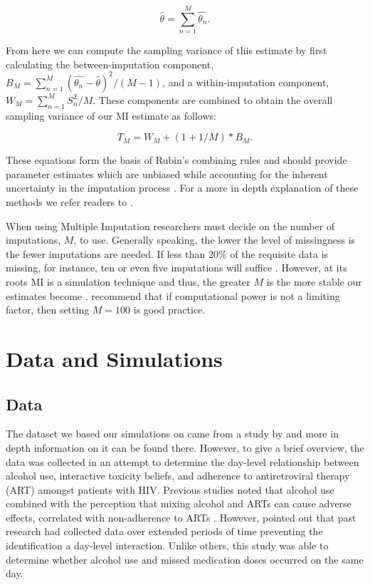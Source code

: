 \documentclass{svjour3}                     %
\begin{document}
\begin{equation}
\widehat{\theta} = \sum_{n=1}^{M} \widehat{\theta_n}.
\end{equation}

From here we can compute the sampling variance of this estimate by first calculating the between-imputation component, $B_M = \sum_{n=1}^{M} (\widehat{\theta_n} - \widehat{\theta})^2 / (M-1)$, and a within-imputation component, $W_M = \sum_{n=1}^{M} S_n^2 / M$. These components are combined to obtain the overall sampling variance of our MI estimate as follows:

\begin{equation}
T_M = W_M + (1+1/M)*B_M.
\end{equation}

These equations form the basis of Rubin's combining rules and should provide parameter estimates which are unbiased while accounting for the inherent uncertainty in the imputation process \citep{raghunathan2015missing}. For a more in depth explanation of these methods we refer readers to \citet{little2014statistical}. \par

When using Multiple Imputation researchers must decide on the number of imputations, $M$, to use. Generally speaking, the lower the level of missingness is the fewer imputations are needed. If less than 20\% of the requisite data is missing, for instance, ten or even five imputations will suffice \citep{raghunathan2015missing}. However, at its roots MI is a simulation technique and thus, the greater $M$ is the more stable our estimates become \citep{harel2007inferences}. \citet{graham2007many} recommend that if computational power is not a limiting factor, then setting $M=100$ is good practice. \par


\section{Data and Simulations}
\label{sec:2}
\subsection{Data}
\label{sec:2.1}
The dataset we based our simulations on came from a study by \citet{pellowski2016alcohol} and more in depth information on it can be found there. However, to give a brief overview, the data was collected in an attempt to determine the day-level relationship between alcohol use, interactive toxicity beliefs, and adherence to antiretroviral therapy (ART) amongst patients with HIV. Previous studies noted that alcohol use combined with the perception that mixing alcohol and ARTs can cause adverse effects, correlated with non-adherence to ARTs \citep{kalichman2009prevalence, kalichman2012alcohol}. However, \citet{pellowski2016alcohol} pointed out that past research had collected data over extended periods of time preventing the identification a day-level interaction. Unlike others, this study was able to determine whether alcohol use and missed medication doses occurred on the same day. \par
\end{document}
